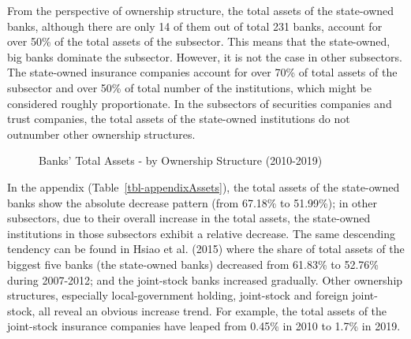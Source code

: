 \documentclass[
  12pt,
  a4paper,
]{scrreprt}
\begin{document}
{{{{From the perspective of ownership structure, the total assets of the
state-owned banks, although there are only 14 of them out of total 231
banks, account for over 50\% of the total assets of the subsector. This
means that the state-owned, big banks dominate the subsector. However,
it is not the case in other subsectors. The state-owned insurance
companies account for over 70\% of total assets of the subsector and
over 50\% of total number of the institutions, which might be considered
roughly proportionate. In the subsectors of securities companies and
trust companies, the total assets of the state-owned institutions do not
outnumber other ownership structures.

\begin{figure}


\caption{\label{fig-AssetsOwnership}Banks' Total Assets - by Ownership
Structure (2010-2019)}

\end{figure}%

In the appendix (Table~\ref{tbl-appendixAssets}), the total assets of
the state-owned banks show the absolute decrease pattern (from 67.18\%
to 51.99\%); in other subsectors, due to their overall increase in the
total assets, the state-owned institutions in those subsectors exhibit a
relative decrease. The same descending tendency can be found in Hsiao et
al. (2015) where the share of total assets of the biggest five banks
(the state-owned banks) decreased from 61.83\% to 52.76\% during
2007-2012; and the joint-stock banks increased gradually. Other
ownership structures, especially local-government holding, joint-stock
and foreign joint-stock, all reveal an obvious increase trend. For
example, the total assets of the joint-stock insurance companies have
leaped from 0.45\% in 2010 to 1.7\% in 2019.

}}}}
\end{document}
